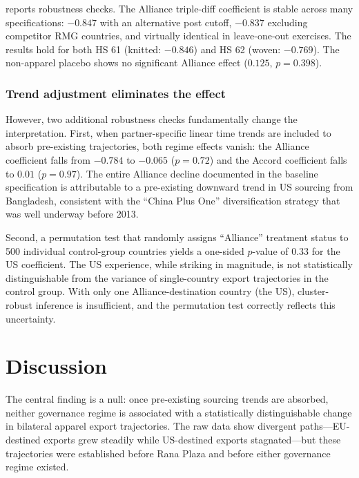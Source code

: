 \documentclass[12pt]{article}
\begin{document}
 reports robustness checks. The Alliance triple-diff coefficient is stable across many specifications: $-0.847$ with an alternative post cutoff, $-0.837$ excluding competitor RMG countries, and virtually identical in leave-one-out exercises. The results hold for both HS 61 (knitted: $-0.846$) and HS 62 (woven: $-0.769$). The non-apparel placebo shows no significant Alliance effect ($0.125$, $p = 0.398$).

\subsubsection*{Trend adjustment eliminates the effect} However, two additional robustness checks fundamentally change the interpretation. First, when partner-specific linear time trends are included to absorb pre-existing trajectories, both regime effects vanish: the Alliance coefficient falls from $-0.784$ to $-0.065$ ($p = 0.72$) and the Accord coefficient falls to $0.01$ ($p = 0.97$). The entire Alliance decline documented in the baseline specification is attributable to a pre-existing downward trend in US sourcing from Bangladesh, consistent with the ``China Plus One'' diversification strategy that was well underway before 2013.

Second, a permutation test that randomly assigns ``Alliance'' treatment status to 500 individual control-group countries yields a one-sided $p$-value of 0.33 for the US coefficient. The US experience, while striking in magnitude, is not statistically distinguishable from the variance of single-country export trajectories in the control group. With only one Alliance-destination country (the US), cluster-robust inference is insufficient, and the permutation test correctly reflects this uncertainty.




\section{Discussion}
\label{sec:discussion}

The central finding is a null: once pre-existing sourcing trends are absorbed, neither governance regime is associated with a statistically distinguishable change in bilateral apparel export trajectories. The raw data show divergent paths---EU-destined exports grew steadily while US-destined exports stagnated---but these trajectories were established before Rana Plaza and before either governance regime existed.
\end{document}
